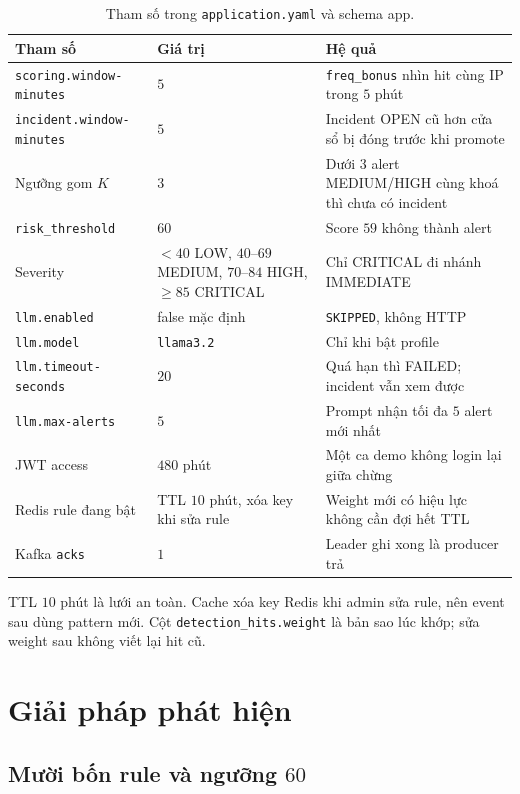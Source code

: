 \documentclass[a4paper,11pt]{article}
\begin{document}
\begin{table}[ht]
\centering
\caption{Tham số trong \texttt{application.yaml} và schema app.}
\label{tab:params}
\small
\begin{tabularx}{\linewidth}{@{}p{4.3cm}p{3.4cm}Y@{}}
\toprule
Tham số & Giá trị & Hệ quả \\
\midrule
\texttt{scoring.window-minutes} & $5$ & \texttt{freq\_bonus} nhìn hit cùng IP trong $5$ phút \\
\texttt{incident.window-minutes} & $5$ & Incident OPEN cũ hơn cửa sổ bị đóng trước khi promote \\
Ngưỡng gom $K$ & $3$ & Dưới $3$ alert MEDIUM/HIGH cùng khoá thì chưa có incident \\
\texttt{risk\_threshold} & $60$ & Score $59$ không thành alert \\
Severity & $<40$ LOW, $40$--$69$ MEDIUM, $70$--$84$ HIGH, $\geq 85$ CRITICAL & Chỉ CRITICAL đi nhánh IMMEDIATE \\
\texttt{llm.enabled} & false mặc định & \texttt{SKIPPED}, không HTTP \\
\texttt{llm.model} & \texttt{llama3.2} & Chỉ khi bật profile \\
\texttt{llm.timeout-seconds} & $20$ & Quá hạn thì FAILED; incident vẫn xem được \\
\texttt{llm.max-alerts} & $5$ & Prompt nhận tối đa $5$ alert mới nhất \\
JWT access & $480$ phút & Một ca demo không login lại giữa chừng \\
Redis rule đang bật & TTL $10$ phút, xóa key khi sửa rule & Weight mới có hiệu lực không cần đợi hết TTL \\
Kafka \texttt{acks} & $1$ & Leader ghi xong là producer trả \\
\bottomrule
\end{tabularx}
\end{table}

TTL $10$ phút là lưới an toàn. Cache xóa key Redis khi admin sửa rule, nên event sau dùng pattern mới. Cột \texttt{detection\_hits.weight} là bản sao lúc khớp; sửa weight sau không viết lại hit cũ.

\section{Giải pháp phát hiện}

\subsection{Mười bốn rule và ngưỡng $60$}
\end{document}
